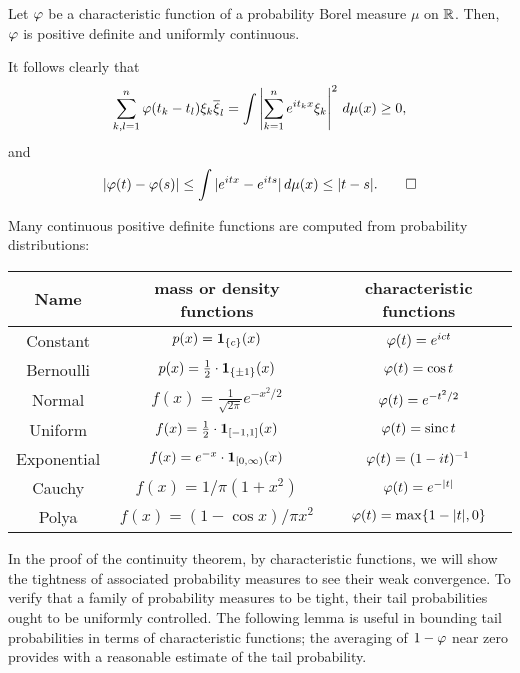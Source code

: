 \documentclass[a4paper]{article}
\begin{document}
\begin{prop}
Let $\varphi$ be a characteristic function of a probability Borel measure $\mu$ on $\mathbb{R}$.
Then, $\varphi$ is positive definite and uniformly continuous.
\end{prop}
\begin{pf}
It follows clearly that
\[\sum_{k,l=1}^n\varphi(t_k-t_l)\xi_k\overline\xi_l=\int\left|\sum_{k=1}^ne^{it_kx}\xi_k\right|^2\,d\mu(x)\ge0,\]
and
\[|\varphi(t)-\varphi(s)|\le\int|e^{itx}-e^{its}|\,d\mu(x)\le|t-s|.\qedhere\]
\end{pf}
\begin{ex}
Many continuous positive definite functions are computed from probability distributions:
\begin{center}\renewcommand{\arraystretch}{1.8}
\begin{tabular}{ccc}
Name & mass or density functions & characteristic functions\\\hline
Constant & $p(x)=\mathbf{1}_{\{c\}}(x)$ & $\varphi(t)=e^{ict}$\\
Bernoulli & $p(x)=\frac12\cdot\mathbf{1}_{\{\pm1\}}(x)$ & $\varphi(t)=\cos t$\\
Normal & $f(x)=\frac1{\sqrt{2\pi}}e^{-x^2/2}$ & $\varphi(t)=e^{-t^2/2}$\\
Uniform & $f(x)=\frac12\cdot\mathbf{1}_{[-1,1]}(x)$ & $\varphi(t)=\operatorname{sinc}t$\\
Exponential & $f(x)=e^{-x}\cdot\mathbf{1}_{[0,\infty)}(x)$ & $\varphi(t)=(1-it)^{-1}$\\
Cauchy & $f(x)=1/\pi(1+x^2)$ & $\varphi(t)=e^{-|t|}$\\
Polya & $f(x)=(1-\cos x)/\pi x^2$ & $\varphi(t)=\max\{1-|t|,0\}$
\end{tabular}
\end{center}
\end{ex}



In the proof of the continuity theorem, by characteristic functions, we will show the tightness of associated probability measures to see their weak convergence.
To verify that a family of probability measures to be tight, their tail probabilities ought to be uniformly controlled.
The following lemma is useful in bounding tail probabilities in terms of characteristic functions; the averaging of $1-\varphi$ near zero provides with a reasonable estimate of the tail probability.
\end{document}
